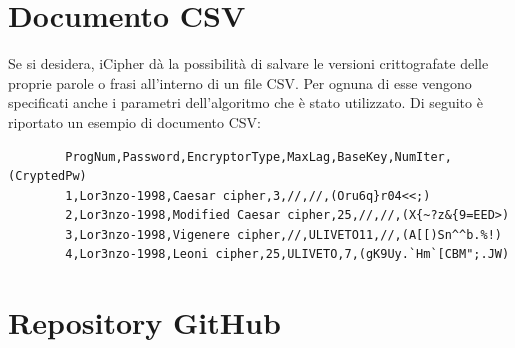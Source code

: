 \documentclass[a4paper, 12pt, one column, aas_macros]{article}
\begin{document}
	\section{Documento CSV}
	Se si desidera, iCipher dà la possibilità di salvare le versioni crittografate delle proprie parole o frasi all'interno di un file CSV. Per ognuna di esse vengono specificati anche i parametri dell'algoritmo che è stato utilizzato. Di seguito è riportato un esempio di documento CSV:
	\begin{verbatim}
		ProgNum,Password,EncryptorType,MaxLag,BaseKey,NumIter,(CryptedPw)
		1,Lor3nzo-1998,Caesar cipher,3,//,//,(Oru6q}r04<<;)
		2,Lor3nzo-1998,Modified Caesar cipher,25,//,//,(X{~?z&{9=EED>)
		3,Lor3nzo-1998,Vigenere cipher,//,ULIVETO11,//,(A[[)Sn^^b.%!)
		4,Lor3nzo-1998,Leoni cipher,25,ULIVETO,7,(gK9Uy.`Hm`[CBM";.JW)
	\end{verbatim}
	
	\section{Repository GitHub}
	
\end{document}
